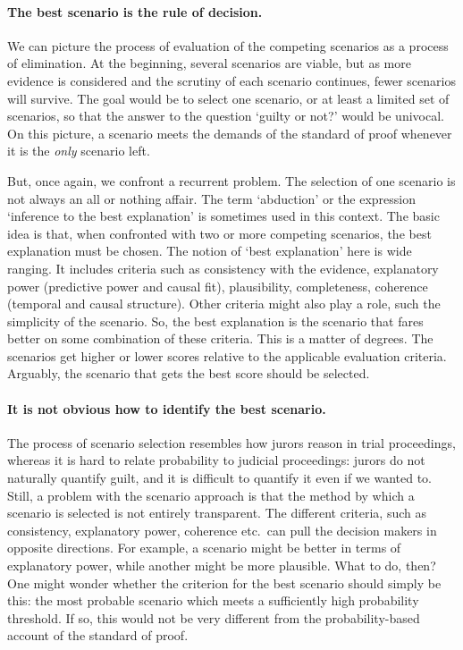 \documentclass[10pt]{article}
\begin{document}
\paragraph{The best scenario is the rule of decision.}

We can picture the process of evaluation of the competing scenarios as a process of elimination. 
At the beginning, several scenarios are viable, but as more evidence is considered and the scrutiny of each scenario continues,
fewer scenarios will survive. The goal would be to select one scenario, or at least a limited set of scenarios, so that 
the answer to the question `guilty or not?' would be univocal. On this picture, a scenario meets the demands of the standard 
of proof whenever it is the \textit{only} scenario left.

But, once again, we confront a recurrent problem. The selection of one scenario is not always an all or nothing affair.
The term `abduction' or the expression `inference to the best explanation' is sometimes used in this context. The basic idea is that, when confronted 
with two or more competing scenarios, the best explanation must be chosen. The notion of `best explanation' here is wide ranging. It includes criteria such as 
consistency with the evidence, explanatory power (predictive power and causal fit), plausibility, completeness, coherence (temporal and causal structure). 
Other criteria might also play a role, such the simplicity of the scenario. So, the best explanation is the scenario that fares 
better on some combination of these criteria. This is a matter of degrees. The scenarios get higher 
or lower scores relative to the applicable evaluation criteria. Arguably, the scenario that gets the best score %
should be selected. 





\paragraph{It is not obvious how to identify the best scenario.}

The process of scenario selection resembles how jurors reason in trial proceedings, whereas %
it is hard to relate probability to judicial proceedings: jurors do not 
naturally quantify guilt, and it is difficult to quantify it even if we wanted to. Still, a problem with the scenario approach is that 
the method by which a scenario is selected is not entirely transparent. The different criteria, such as consistency, explanatory power, coherence etc.\ 
can pull the decision makers in opposite directions. For example, a scenario might be better in terms of explanatory power, while another might 
be more plausible. What to do, then? One might wonder whether the criterion for the best scenario should simply be this:
the most probable scenario which meets a sufficiently high probability threshold. If so, this would not be very 
different from the probability-based account of the standard of proof. 
\end{document}

